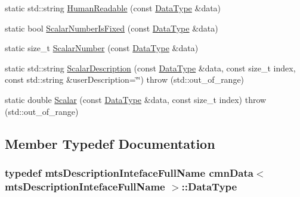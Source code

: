 \begin{DoxyCompactItemize}
\item 
static std\-::string \hyperlink{classcmn_data_3_01mts_description_inteface_full_name_01_4_a2838a99cc753656b9302c5186689d936}{Human\-Readable} (const \hyperlink{classcmn_data_3_01mts_description_inteface_full_name_01_4_a7c49303638b183151217d48ca5d2eda8}{Data\-Type} \&data)
\item 
static bool \hyperlink{classcmn_data_3_01mts_description_inteface_full_name_01_4_a308df64feba1f0b487a550b7d343f06d}{Scalar\-Number\-Is\-Fixed} (const \hyperlink{classcmn_data_3_01mts_description_inteface_full_name_01_4_a7c49303638b183151217d48ca5d2eda8}{Data\-Type} \&data)
\item 
static size\-\_\-t \hyperlink{classcmn_data_3_01mts_description_inteface_full_name_01_4_a6ce5997eb60d7ad40a2f189d0bd16b24}{Scalar\-Number} (const \hyperlink{classcmn_data_3_01mts_description_inteface_full_name_01_4_a7c49303638b183151217d48ca5d2eda8}{Data\-Type} \&data)
\item 
static std\-::string \hyperlink{classcmn_data_3_01mts_description_inteface_full_name_01_4_a74d3b7e82196937c94994e6e49c156d5}{Scalar\-Description} (const \hyperlink{classcmn_data_3_01mts_description_inteface_full_name_01_4_a7c49303638b183151217d48ca5d2eda8}{Data\-Type} \&data, const size\-\_\-t index, const std\-::string \&user\-Description=\char`\"{}\char`\"{})  throw (std\-::out\-\_\-of\-\_\-range)
\item 
static double \hyperlink{classcmn_data_3_01mts_description_inteface_full_name_01_4_a23f8910c7b9e69b8586f76c5760c7011}{Scalar} (const \hyperlink{classcmn_data_3_01mts_description_inteface_full_name_01_4_a7c49303638b183151217d48ca5d2eda8}{Data\-Type} \&data, const size\-\_\-t index)  throw (std\-::out\-\_\-of\-\_\-range)
\end{DoxyCompactItemize}


\subsection{Member Typedef Documentation}
\hypertarget{classcmn_data_3_01mts_description_inteface_full_name_01_4_a7c49303638b183151217d48ca5d2eda8}{
\subsubsection[{Data\-Type}]{\setlength{\rightskip}{0pt plus 5cm}typedef {\bf mts\-Description\-Inteface\-Full\-Name} {\bf cmn\-Data}$<$ {\bf mts\-Description\-Inteface\-Full\-Name} $>$\-::{\bf Data\-Type}}}\label{classcmn_data_3_01mts_description_inteface_full_name_01_4_a7c49303638b183151217d48ca5d2eda8}



